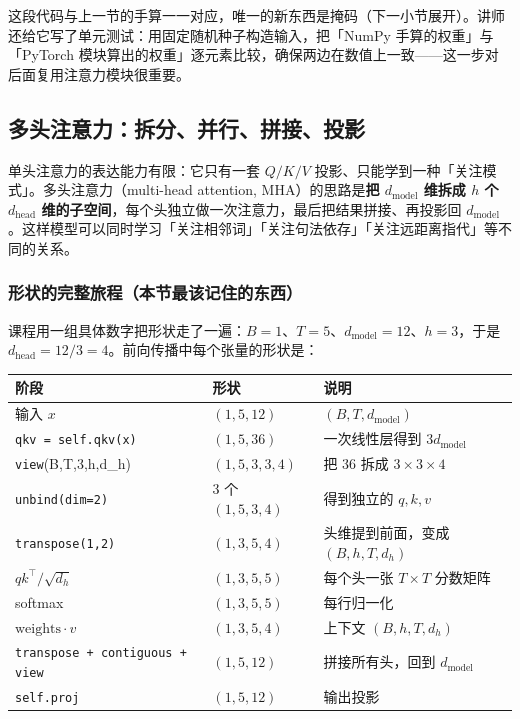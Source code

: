 这段代码与上一节的手算一一对应，唯一的新东西是掩码（下一小节展开）。讲师还给它写了单元测试：用固定随机种子构造输入，把「NumPy 手算的权重」与「PyTorch 模块算出的权重」逐元素比较，确保两边在数值上一致——这一步对后面复用注意力模块很重要。

\subsection{多头注意力：拆分、并行、拼接、投影}

单头注意力的表达能力有限：它只有一套 $Q/K/V$ 投影、只能学到一种「关注模式」。多头注意力（multi-head attention, MHA）的思路是\textbf{把 $d_{\text{model}}$ 维拆成 $h$ 个 $d_{\text{head}}$ 维的子空间}，每个头独立做一次注意力，最后把结果拼接、再投影回 $d_{\text{model}}$。这样模型可以同时学习「关注相邻词」「关注句法依存」「关注远距离指代」等不同的关系。

\subsubsection{形状的完整旅程（本节最该记住的东西）}

课程用一组具体数字把形状走了一遍：$B=1$、$T=5$、$d_{\text{model}}=12$、$h=3$，于是 $d_{\text{head}}=12/3=4$。前向传播中每个张量的形状是：

\begin{center}
\begin{tabular}{@{}p{4.0cm}p{3.2cm}p{6.8cm}@{}}
\toprule
阶段 & 形状 & 说明 \\
\midrule
输入 $x$ & $(1,5,12)$ & $(B,T,d_{\text{model}})$ \\
\texttt{qkv = self.qkv(x)} & $(1,5,36)$ & 一次线性层得到 $3d_{\text{model}}$ \\
\texttt{view}(B,T,3,h,d\_h) & $(1,5,3,3,4)$ & 把 36 拆成 $3\times3\times4$ \\
\texttt{unbind(dim=2)} & 3 个 $(1,5,3,4)$ & 得到独立的 $q,k,v$ \\
\texttt{transpose(1,2)} & $(1,3,5,4)$ & 头维提到前面，变成 $(B,h,T,d_h)$ \\
$q k^{\top}/\sqrt{d_h}$ & $(1,3,5,5)$ & 每个头一张 $T\times T$ 分数矩阵 \\
softmax & $(1,3,5,5)$ & 每行归一化 \\
$\text{weights}\cdot v$ & $(1,3,5,4)$ & 上下文 $(B,h,T,d_h)$ \\
\texttt{transpose + contiguous + view} & $(1,5,12)$ & 拼接所有头，回到 $d_{\text{model}}$ \\
\texttt{self.proj} & $(1,5,12)$ & 输出投影 \\
\bottomrule
\end{tabular}
\end{center}

